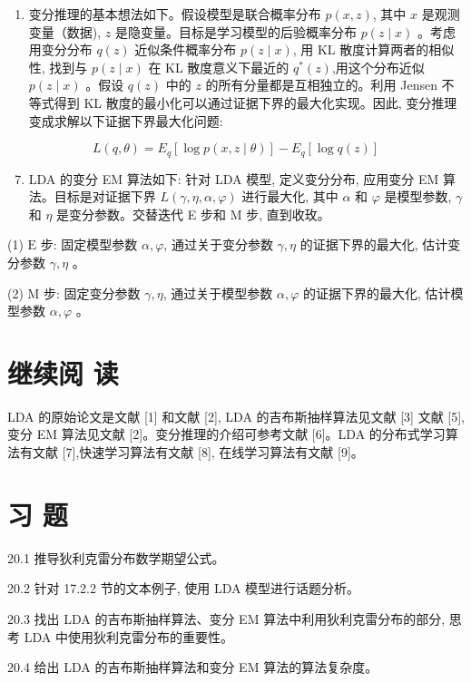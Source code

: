 \documentclass[10pt]{article}
\begin{document}
\begin{CJK*}{UTF8}{bsmi}
\begin{enumerate}
  \item 变分推理的基本想法如下。假设模型是联合概率分布 $p(x, z)$, 其中 $x$ 是观测变量（数据), $z$ 是隐变量。目标是学习模型的后验概率分布 $p(z \mid x)$ 。考虑用变分分布 $q(z)$ 近似条件概率分布 $p(z \mid x)$, 用 KL 散度计算两者的相似性, 找到与 $p(z \mid x)$ 在 KL 散度意义下最近的 $q^{*}(z)$,用这个分布近似 $p(z \mid x)$ 。假设 $q(z)$ 中的 $z$ 的所有分量都是互相独立的。利用 Jensen 不等式得到 KL 散度的最小化可以通过证据下界的最大化实现。因此, 变分推理变成求解以下证据下界最大化问题:

\end{enumerate}

$$
L(q, \theta)=E_{q}[\log p(x, z \mid \theta)]-E_{q}[\log q(z)]
$$

\begin{enumerate}
  \setcounter{enumi}{6}
  \item LDA 的变分 EM 算法如下: 针对 LDA 模型, 定义变分分布, 应用变分 EM 算法。目标是对证据下界 $L(\gamma, \eta, \alpha, \varphi)$ 进行最大化, 其中 $\alpha$ 和 $\varphi$ 是模型参数, $\gamma$ 和 $\eta$ 是变分参数。交替迭代 E 步和 $\mathrm{M}$ 步, 直到收玫。
\end{enumerate}

(1) $\mathrm{E}$ 步: 固定模型参数 $\alpha, \varphi$, 通过关于变分参数 $\gamma, \eta$ 的证据下界的最大化, 估计变分参数 $\gamma, \eta$ 。

(2) $\mathrm{M}$ 步: 固定变分参数 $\gamma, \eta$, 通过关于模型参数 $\alpha, \varphi$ 的证据下界的最大化, 估计模型参数 $\alpha, \varphi$ 。

\section*{继续阅 读}
LDA 的原始论文是文献 [1] 和文献 [2], LDA 的吉布斯抽样算法见文献 [3] 文献 [5], 变分 EM 算法见文献 [2]。变分推理的介绍可参考文献 [6]。LDA 的分布式学习算法有文献 [7],快速学习算法有文献 [8], 在线学习算法有文献 [9]。

\section*{习 题}
20.1 推导狄利克雷分布数学期望公式。

20.2 针对 17.2.2 节的文本例子, 使用 LDA 模型进行话题分析。

20.3 找出 LDA 的吉布斯抽样算法、变分 EM 算法中利用狄利克雷分布的部分, 思考 LDA 中使用狄利克雷分布的重要性。

20.4 给出 LDA 的吉布斯抽样算法和变分 EM 算法的算法复杂度。


\end{CJK*}
\end{document}
